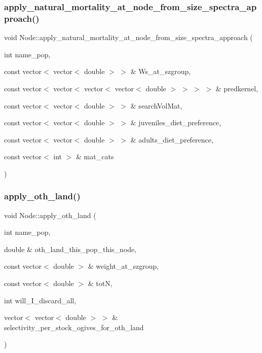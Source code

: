 \subsubsection{\texorpdfstring{apply\_natural\_mortality\_at\_node\_from\_size\_spectra\_approach()}{apply\_natural\_mortality\_at\_node\_from\_size\_spectra\_approach()}}
{\footnotesize\ttfamily void Node\+::apply\+\_\+natural\+\_\+mortality\+\_\+at\+\_\+node\+\_\+from\+\_\+size\+\_\+spectra\+\_\+approach (\begin{DoxyParamCaption}\item[{int}]{name\+\_\+pop,  }\item[{const vector$<$ vector$<$ double $>$ $>$ \&}]{Ws\+\_\+at\+\_\+szgroup,  }\item[{const vector$<$ vector$<$ vector$<$ vector$<$ double $>$ $>$ $>$ $>$ \&}]{predkernel,  }\item[{const vector$<$ vector$<$ double $>$ $>$ \&}]{search\+Vol\+Mat,  }\item[{const vector$<$ vector$<$ double $>$ $>$ \&}]{juveniles\+\_\+diet\+\_\+preference,  }\item[{const vector$<$ vector$<$ double $>$ $>$ \&}]{adults\+\_\+diet\+\_\+preference,  }\item[{const vector$<$ int $>$ \&}]{mat\+\_\+cats }\end{DoxyParamCaption})}

\mbox{\label{class_node_a95a3d109bb71d0ef163a9fbf002a9043}} 
\subsubsection{\texorpdfstring{apply\_oth\_land()}{apply\_oth\_land()}}
{\footnotesize\ttfamily void Node\+::apply\+\_\+oth\+\_\+land (\begin{DoxyParamCaption}\item[{int}]{name\+\_\+pop,  }\item[{double \&}]{oth\+\_\+land\+\_\+this\+\_\+pop\+\_\+this\+\_\+node,  }\item[{const vector$<$ double $>$ \&}]{weight\+\_\+at\+\_\+szgroup,  }\item[{const vector$<$ double $>$ \&}]{totN,  }\item[{int}]{will\+\_\+\+I\+\_\+discard\+\_\+all,  }\item[{vector$<$ vector$<$ double $>$ $>$ \&}]{selectivity\+\_\+per\+\_\+stock\+\_\+ogives\+\_\+for\+\_\+oth\+\_\+land }\end{DoxyParamCaption})}

